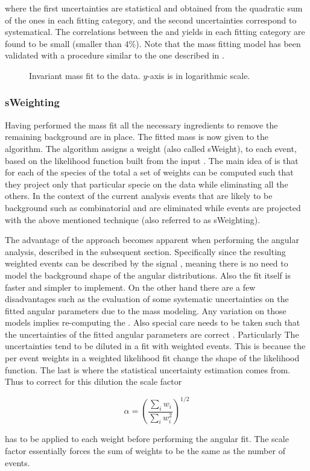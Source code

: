 \noindent where the first uncertainties are statistical and obtained from the quadratic sum of the ones in each fitting category,
and the second uncertainties correspond to systematical. The correlations between the \Bd and \Bs yields in each fitting category
are found to be small (smaller than $4\%$). Note that the mass fitting model has been validated with a procedure similar to the
one described in .

\begin{figure}[h]
\begin{center}
  \scalebox{0.5}{}
  \caption{Invariant mass fit to the data. $y$-axis is in logarithmic scale.}
  \label{mass_plot}
\end{center}
\end{figure}

\subsubsection{sWeighting}
Having performed the mass fit all the necessary ingredients to remove the remaining background are in place.
The fitted mass \pdf is now given to the \sPlot algorithm. The algorithm assigns a weight (also called sWeight), to each event,
based on the likelihood function built from the input \pdf. The main idea of \sPlot is that for each of the species of the total
\pdf a set of weights can be computed such that they project only that particular specie on the data while eliminating all the others.
In the context of the current analysis events that are likely to be background such as combinatorial and \LbJpsipK are
eliminated while \BJpsiKst events are projected with the above mentioned technique (also referred to as sWeighting).

The advantage of the \sWeights approach becomes apparent when performing the angular analysis, described in the subsequent section. Specifically since the resulting
\BsJpsiKst weighted events can be described by the signal \pdf, meaning there is no need to model the background shape of the angular distributions.
Also the fit itself is faster and simpler to implement. On the other hand there are a few
disadvantages such as the evaluation of some systematic uncertainties on the fitted angular parameters due to the mass \pdf modeling.
Any variation on those models implies re-computing the \sWeights. Also special care needs to be taken such that the uncertainties
of the fitted angular parameters are correct \cite{splot}. Particularly The uncertainties tend to be diluted in a fit with weighted
events. This is because the per event weights in a weighted likelihood fit change the shape of the likelihood function. The last is
where the statistical uncertainty estimation comes from. Thus to correct for this dilution the scale factor

\begin{equation}
\alpha = \left(\frac{\sum_{i} w_i}{\sum_{i} w_i^2}\right)^{1/2}
\label{sWeights_scale_factor}
\end{equation}

\noindent has to be applied to each weight before performing the angular fit. The scale factor essentially forces the sum of weights
to be the same as the number of events.
